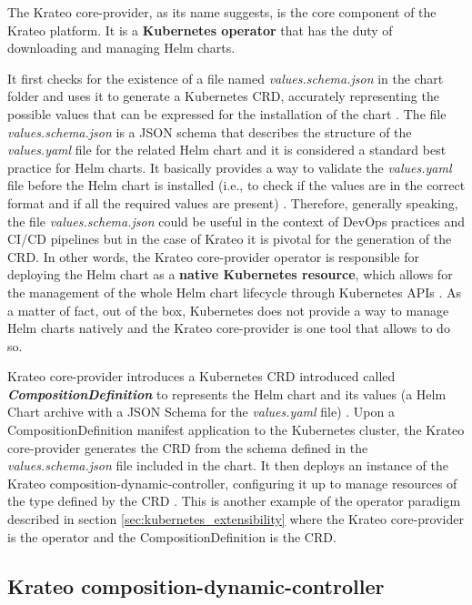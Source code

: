 The Krateo core-provider, as its name suggests, is the core component of the Krateo platform.
It is a \textbf{Kubernetes operator} that has the duty of downloading and managing Helm charts. 

It first checks for the existence of a file named \textit{values.schema.json} in the chart folder and uses it to generate a Kubernetes CRD, accurately representing the possible values that can be expressed for the installation of the chart \cite{krateo_core_provider}.
The file \textit{values.schema.json} is a JSON schema that describes the structure of the \textit{values.yaml} file for the related Helm chart and it is considered a standard best practice for Helm charts. 
It basically provides a way to validate the \textit{values.yaml} file before the Helm chart is installed (i.e., to check if the values are in the correct format and if all the required values are present) \cite{krateo_core_provider}.
Therefore, generally speaking, the file \textit{values.schema.json} could be useful in the context of DevOps practices and CI/CD pipelines but in the case of Krateo it is pivotal for the generation of the CRD.
In other words, the Krateo core-provider operator is responsible for deploying the Helm chart as a \textbf{native Kubernetes resource}, which allows for the management of the whole Helm chart lifecycle through Kubernetes APIs \cite{krateo_core_provider}.
As a matter of fact, out of the box, Kubernetes does not provide a way to manage Helm charts natively and the Krateo core-provider is one tool that allows to do so.

Krateo core-provider introduces a Kubernetes CRD introduced called \textbf{\textit{CompositionDefinition}} to represents the Helm chart and its values (a Helm Chart archive with a JSON Schema for the \textit{values.yaml} file) \cite{krateo_core_provider}.
Upon a CompositionDefinition manifest application to the Kubernetes cluster, the Krateo core-provider generates the CRD from the schema defined in the \textit{values.schema.json} file included in the chart. 
It then deploys an instance of the Krateo composition-dynamic-controller, configuring it up to manage resources of the type defined by the CRD \cite{krateo_core_provider}.
This is another example of the operator paradigm described in section \ref{sec:kubernetes_extensibility} where the Krateo core-provider is the operator and the CompositionDefinition is the CRD.

\subsection{Krateo composition-dynamic-controller}

